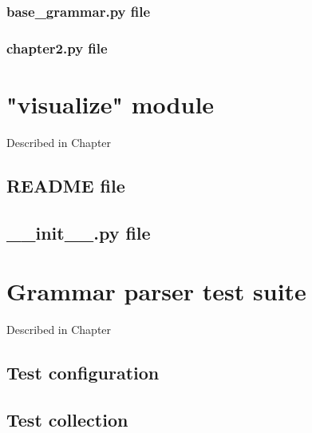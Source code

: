 \subsection{base\_grammar.py file}



\subsection{chapter2.py file}



\chapter{"visualize" module}
\label{appendix:visualize-annex}

Described in Chapter %

\section{README file}



\section{\_\_init\_\_.py file}



\chapter{Grammar parser test suite}
\label{appendix:parser-testing-annex}

Described in Chapter %

\section{Test configuration}



\section{Test collection}

